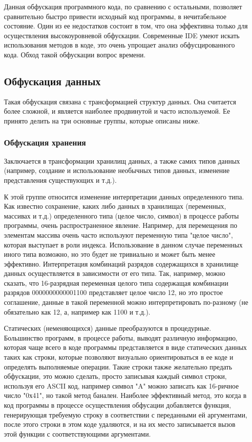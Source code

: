 Данная обфускация программного кода, по сравнению с остальными, позволяет сравнительно быстро привести исходный код программы, в нечитабельное состояние. Один из ее недостатков состоит в том, что она эффективна только для осуществления высокоуровневой обфускации. Современные IDE умеют искать использования методов в коде, это очень упрощает анализ обфусцированного кода. Обход такой обфускации вопрос времени.

\subsection{Обфускация данных}

Такая обфускация связана с трансформацией структур данных. Она считается более сложной, и является наиболее продвинутой и часто используемой. Ее принято делить на три основные группы, которые описаны ниже.


\subsubsection{Обфускация хранения}

Заключается в трансформации хранилищ данных, а также самих типов данных (например, создание и использование необычных типов данных, изменение представления существующих и т.д.).

К этой группе относится изменение интерпретации данных определенного типа. Как известно сохранение, каких либо данных в хранилищах (переменных, массивах и т.д.) определенного типа (целое число, символ) в процессе работы программы, очень распространенное явление. Например, для перемещения по элементам массива очень часто используют переменную типа "целое число", которая выступает в роли индекса. Использование в данном случае переменных иного типа возможно, но это будет не тривиально и может быть менее эффективно. Интерпретация комбинаций разрядов содержащихся в хранилище данных осуществляется в зависимости от его типа. Так, например, можно сказать, что 16-разрядная переменная целого типа содержащая комбинации разрядов 0000000000001100 представляет целое число 12, но это простое соглашение, данные в такой переменной можно интерпретировать по-разному (не обязательно как 12, а, например как 1100 и т.д.).

Статических (неменяющихся) данные преобразуются в процедурные. Большинство программ, в процессе работы, выводят различную информацию, которая чаще всего в коде программы представляется в виде статических данных таких как строки, которые позволяют визуально ориентироваться в ее коде и определять выполняемые операции. Такие строки также желательно предать обфускации, это можно сделать, просто записывая каждый символ строки, используя его ASCII код, например символ "A" можно записать как 16-ричное число "0х41", но такой метод банален. Наиболее эффективный метод, это когда в код программы в процессе осуществления обфусации добавляется функция, генерирующая требуемую строку в соответствии с переданными ей аргументами, после этого строки в этом коде удаляются, и на их место записывается вызов этой функции с соответствующими аргументами.

